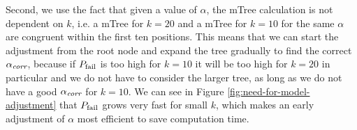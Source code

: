 Second, we use the fact that given a value of $\alpha$, the mTree calculation is not dependent on $ k $, i.e. a mTree for $k=20$ and a mTree for $k=10$ for the same $\alpha$ are congruent within the first ten positions.
%
This means that we can start the adjustment from the root node and expand the tree gradually to find the correct $ \alpha_\textit{corr} $, because if $P_{\operatorname{fail}}$ is too high for $k=10$ it will be too high for $k=20$ in particular and we do not have to consider the larger tree, as long as we do not have a good $\alpha_\textit{corr}$ for $k=10$.
%
%
%
%
%
%
%
We can see in Figure \ref{fig:need-for-model-adjustment} that $ P_{\operatorname{fail}} $ grows very fast for small $k$, which makes an early adjustment of $\alpha$ most efficient to save computation time.

